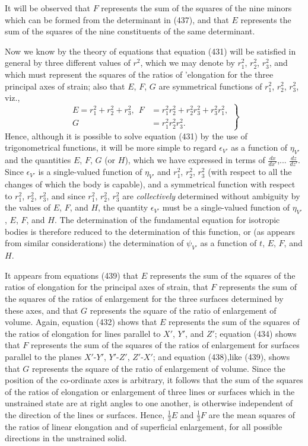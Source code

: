 \documentclass[12pt]{memoir}
\begin{document}
{It will be observed that $F$ represents the sum of the squares of the nine minors which can be formed from the determinant in (437), and that $E$ represents the sum of the squares of the nine constituents of the same determinant.


Now we know by the theory of equations that equation (431) will be satisfied in general by three different values of $r^2$, which we may denote by $r_1^2$, $r_2^2$, $r_3^2$, and which must represent the squares of the ratios of 'elongation for the three principal axes of strain; also that $E$, $F$, $G$ are symmetrical functions of $r_1^2$, $r_2^2$, $r_3^2$, viz.,
\begin{equation} \left. \begin{aligned}
E=r_1^2+r_2^2+r_3^2, \ \ F&=r_1^2r_2^2+r_2^2 r_3^2 +r_3^2 r_1^2, \\
G &= r_1^2 r_2^2 r_3^2.
\end{aligned} \right\} \label{439}\end{equation}
Hence, although it is possible to solve equation (431) by the use of trigonometrical functions, it will be more simple to regard $\epsilon_{V'}$ as a function of $\eta_{V'}$ and the quantities $E$, $F$, $G$ (or $H$), which we have expressed in terms of $\frac{dx}{dx'}$,... $\frac{dz}{dz'}$. Since $\epsilon_{V'}$ is a single-valued function of $\eta_{V'}$ and $r_1^2$, $r_2^2$, $r_3^2$ (with respect to all the changes of which the body is capable), and a symmetrical function with respect to $r_1^2$, $r_2^2$, $r_3^2$, and since $r_1^2$, $r_2^2$, $r_3^2$ are \textit{collectively} determined without ambiguity by the values of $E$, $F$, and $H$, the quantity $\epsilon_{V'}$ must be a single-valued function of $\eta_{V'}$, $E$, $F$, and $H$. The determination of the fundamental equation for isotropic bodies is therefore reduced to the determination of this function, or (as appears from similar considerations) the determination of $\psi_{V'}$ as a function of $t$, $E$, $F$, and $H$.


It appears from equations (439) that $E$ represents the sum of the squares of the ratios of elongation for the principal axes of strain, that $F$ represents the sum of the squares of the ratios of enlargement for the three surfaces determined by these axes, and that $G$ represents the square of the ratio of enlargement of volume. Again, equation (432) shows that $E$ represents the sum of the squares of the ratios of elongation for lines parallel to $X'$, $Y'$, and $Z'$; equation (434) shows that $F$ represents the sum of the squares of the ratios of enlargement for surfaces parallel to the planes $X'$-$Y'$, $Y'$-$Z'$, $Z'$-$X'$; and equation (438),like (439), shows that $G$ represents the square of the ratio of enlargement of volume. Since the position of the co-ordinate axes is arbitrary, it follows that the sum of the squares of the ratios of elongation or enlargement of three lines or surfaces which in the unstrained state are at right angles to one another, is otherwise independent of the direction of the lines or surfaces. Hence, $\frac{1}{3}E$ and $\frac{1}{3}F$ are the mean squares of the ratios of linear elongation and of superficial enlargement, for all possible directions in the unstrained solid.


}
\end{document}

